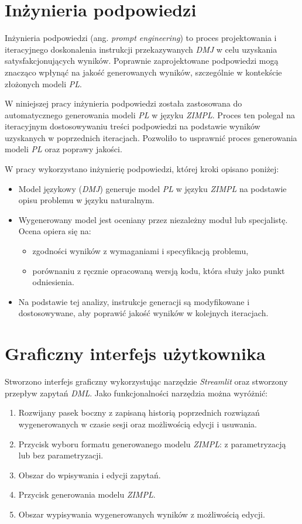 \section{Inżynieria podpowiedzi}
Inżynieria podpowiedzi (ang. \textit{prompt engineering}) to proces projektowania i iteracyjnego doskonalenia instrukcji przekazywanych \textit{DMJ} w celu uzyskania satysfakcjonujących wyników. Poprawnie zaprojektowane podpowiedzi mogą znacząco wpłynąć na jakość generowanych wyników, szczególnie w kontekście złożonych modeli \textit{PL}.

W niniejszej pracy inżynieria podpowiedzi została zastosowana do automatycznego generowania modeli \textit{PL} w języku \textit{ZIMPL}. Proces ten polegał na iteracyjnym dostosowywaniu treści podpowiedzi na podstawie wyników uzyskanych w poprzednich iteracjach. Pozwoliło to usprawnić proces generowania modeli \textit{PL} oraz poprawy jakości.

W pracy wykorzystano inżynierię podpowiedzi, której kroki opisano poniżej:
\begin{itemize} 
\item Model językowy (\textit{DMJ}) generuje model \textit{PL} w języku \textit{ZIMPL} na podstawie opisu problemu w języku naturalnym. 
\item Wygenerowany model jest oceniany przez niezależny moduł lub specjalistę. Ocena opiera się na: 
    \begin{itemize} 
        \item zgodności wyników z wymaganiami i specyfikacją problemu, 
        \item porównaniu z ręcznie opracowaną wersją kodu, która służy jako punkt odniesienia. 
    \end{itemize} 
\item Na podstawie tej analizy, instrukcje generacji są modyfikowane i dostosowywane, aby poprawić jakość wyników w kolejnych iteracjach.\end{itemize}


\section{Graficzny interfejs użytkownika}\label{sec:generation:gui}

Stworzono interfejs graficzny wykorzystując narzędzie \textit{Streamlit} \cite{Streamlit2019} oraz stworzony przepływ zapytań \textit{DML}. Jako funkcjonalności narzędzia można wyróżnić:

\begin{enumerate}
\item Rozwijany pasek boczny z zapisaną historią poprzednich rozwiązań wygenerowanych w czasie sesji oraz możliwością edycji i usuwania.
\item Przycisk wyboru formatu generowanego modelu \textit{ZIMPL}: z parametryzacją lub bez parametryzacji.
\item Obszar do wpisywania i edycji zapytań.
\item Przycisk generowania modelu \textit{ZIMPL}.
\item Obszar wypisywania wygenerowanych wyników z możliwością edycji.
\end{enumerate}

